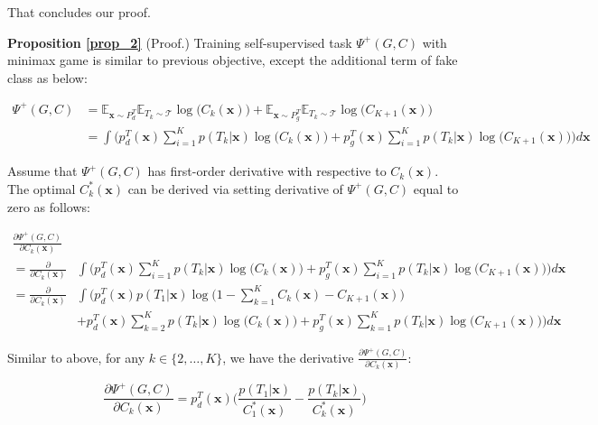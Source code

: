 \documentclass{article}
\begin{document}
That concludes our proof.
 


\noindent \textbf{Proposition \ref{prop_2}} (Proof.) Training self-supervised task $\Psi^+(G,C)$ with minimax game is similar to previous objective, except the additional term of fake class as below:

\begin{equation}
\begin{split}
\Psi^+(G,C) &= \mathbb{E}_{\mathbf{x} \sim P_d^T} \mathbb{E}_{T_k \sim \mathcal{T}}\log\Big(C_k(\mathbf{x})\Big) + \mathbb{E}_{\mathbf{x} \sim P_g^T}\mathbb{E}_{T_k \sim \mathcal{T}}\log\Big(C_{K+1}(\mathbf{x})\Big)\\
&= \int \Bigg(p_d^T(\mathbf{x})\sum_{i=1}^{K}p({T_k}|\mathbf{x})\log\Big(C_k(\mathbf{x})\Big) + p_g^T(\mathbf{x})\sum_{i=1}^{K}p({T_k}|\mathbf{x})\log\Big(C_{K+1}(\mathbf{x})\Big)\Bigg)d\mathbf{x}
\end{split}
\label{d_obj_ss_adv_1}
\end{equation}

Assume that $\Psi^+(G,C)$ has first-order derivative with respective to $C_k(\mathbf{x})$. The optimal $C^*_k(\mathbf{x})$ can be derived via setting derivative of $\Psi^+(G,C)$ equal to zero as follows:

\begin{equation}
\begin{split}
\frac{\partial\Psi^+(G,C)}{\partial C_k(\mathbf{x})} \\
= \frac{\partial}{\partial C_k(\mathbf{x})} &\int \Bigg(p_d^T(\mathbf{x})\sum_{i=1}^{K}p({T_k}|\mathbf{x})\log\Big(C_k(\mathbf{x})\Big) + p_g^T(\mathbf{x})\sum_{i=1}^{K}p({T_k}|\mathbf{x})\log\Big(C_{K+1}(\mathbf{x})\Big)\Bigg)d\mathbf{x}\\
= \frac{\partial}{\partial C_k(\mathbf{x})} &\int \bigg(p_d^T(\mathbf{x})p({T_1}|\mathbf{x})\log\Big(1 - \sum_{k=1}^{K}C_k(\mathbf{x}) - C_{K+1}(\mathbf{x})\Big)\\
&+ p_d^T(\mathbf{x})\sum_{k=2}^{K}p({T_k}|\mathbf{x})\log\Big(C_k(\mathbf{x})\Big) + {p_g^T(\mathbf{x})}\sum_{k=1}^{K}p({T_k}|\mathbf{x})\log\Big(C_{K+1}(\mathbf{x})\Big)\bigg)d\mathbf{x}
\end{split}
\end{equation}

Similar to above, for any $k \in \{2, \dots, K\}$, we have the derivative $\frac{\partial\Psi^+(G,C)}{\partial C_k(\mathbf{x})}$:

\begin{equation}
\frac{\partial\Psi^+(G,C)}{\partial C_k(\mathbf{x})} = p_d^T(\mathbf{x})\Big(\frac{p({T_1}|\mathbf{x})}{C^*_1(\mathbf{x})} - \frac{p({T_k}|\mathbf{x})}{C^*_k(\mathbf{x})}\Big)
\end{equation}
\end{document}
